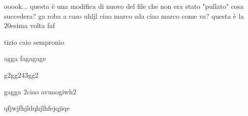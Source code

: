 \usepackage{pdfcomment}


    ooook... questa è una modifica di nuovo del file che non era stato "pullato" cosa succedera?
ga    roba a caso 
uhljl
ciao marco sda
ciao marco come va? questa è la 20esima volta 
    faf
    

    tizio caio
    sempronio

    agga
    fagagage


    g2gg243gg2

    gagga
    2ciao avuaogiwh2







    qfjwjfhjldqhjlhfejqjiqe
